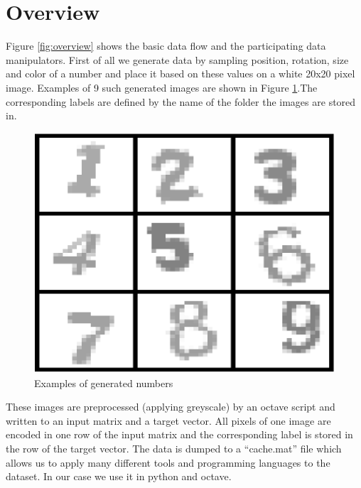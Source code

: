 \documentclass{article}
\begin{document}
\section{Overview}
Figure \ref{fig:overview} shows the basic data flow and the participating data manipulators. First of all we generate data by sampling position, rotation, size and color of a number and place it based on these values on a white 20x20 pixel image. Examples of 9 such generated images are shown in Figure \ref{fig:generated_numbers}.The corresponding labels are defined by the name of the folder the images are stored in.
\begin{figure}[ht]
	\centerline{\includegraphics[scale=0.25]{../examples}}
	\caption{Examples of generated numbers}
	\label{fig:generated_numbers}
\end{figure}
These images are preprocessed (applying greyscale) by an octave script and written to an input matrix and a target vector. All pixels of one image are encoded in one row of the input matrix and the corresponding label is stored in the row of the target vector. The data is dumped to a ``cache.mat'' file which allows us to apply many different tools and programming languages to the dataset. In our case we use it in python and octave.
\end{document}

